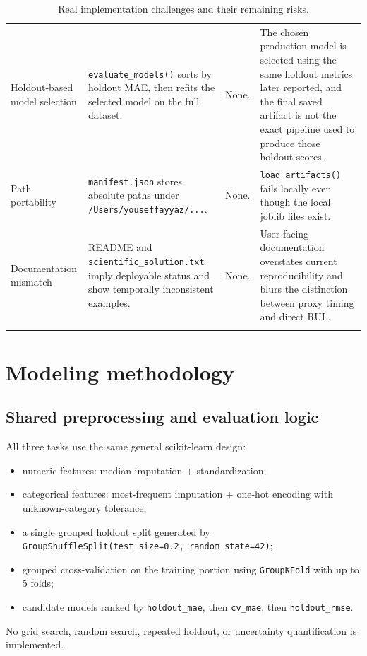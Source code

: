 \documentclass[11pt]{article}
\begin{document}
\begin{longtable}{p{} p{} p{} p{}}
Holdout-based model selection & \texttt{evaluate\_models()} sorts by holdout MAE, then refits the selected model on the full dataset. & None. & The chosen production model is selected using the same holdout metrics later reported, and the final saved artifact is not the exact pipeline used to produce those holdout scores. \\
Path portability & \texttt{manifest.json} stores absolute paths under \texttt{/Users/youseffayyaz/...}. & None. & \texttt{load\_artifacts()} fails locally even though the local joblib files exist. \\
Documentation mismatch & README and \texttt{scientific\_solution.txt} imply deployable status and show temporally inconsistent examples. & None. & User-facing documentation overstates current reproducibility and blurs the distinction between proxy timing and direct RUL. \\
\bottomrule
\caption{Real implementation challenges and their remaining risks.}
\label{tab:challenges}
\end{longtable}

\section{Modeling methodology}

\subsection{Shared preprocessing and evaluation logic}
All three tasks use the same general scikit-learn design:
\begin{itemize}
  \item numeric features: median imputation + standardization;
  \item categorical features: most-frequent imputation + one-hot encoding with unknown-category tolerance;
  \item a single grouped holdout split generated by \texttt{GroupShuffleSplit(test\_size=0.2, random\_state=42)};
  \item grouped cross-validation on the training portion using \texttt{GroupKFold} with up to 5 folds;
  \item candidate models ranked by \texttt{holdout\_mae}, then \texttt{cv\_mae}, then \texttt{holdout\_rmse}.
\end{itemize}

No grid search, random search, repeated holdout, or uncertainty quantification is implemented.
\end{document}
